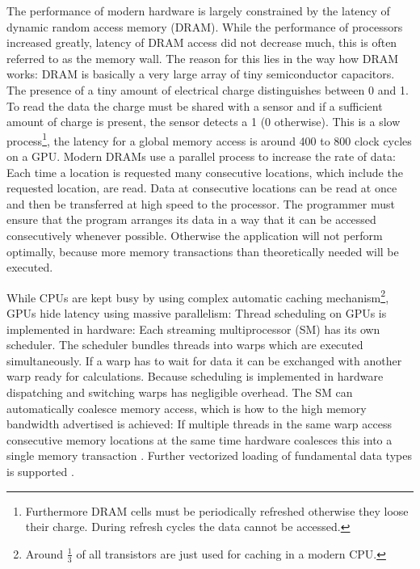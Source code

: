 The performance of modern hardware is largely constrained by the latency of dynamic random access memory (DRAM). While the performance of processors increased greatly, latency of DRAM access did not decrease much, this is often referred to as the memory wall. The reason for this lies in the way how DRAM works: DRAM is basically a very large array of tiny semiconductor capacitors. The presence of a tiny amount of electrical charge distinguishes between 0 and 1. To read the data the charge must be shared with a sensor and if a sufficient amount of charge is present, the sensor detects a 1 (0 otherwise). This is a slow process\footnote{Furthermore DRAM cells must be periodically refreshed otherwise they loose their charge. During refresh cycles the data cannot be accessed.}, the latency for a global memory access is around 400 to 800 clock cycles \cite[5.2.3]{cudaguide} on a GPU.  Modern DRAMs use a parallel process to increase the rate of data: Each time a location is requested many consecutive locations, which include the requested location, are read. Data at consecutive locations can be read at once and then be transferred at high speed to the processor. The programmer must ensure that the program arranges its data in a way that it can be accessed consecutively whenever possible. Otherwise the application will not perform optimally, because more memory transactions than theoretically needed will be executed.

While CPUs are kept busy by using complex automatic caching mechanism\footnote{Around $\frac{1}{3}$ of all transistors are just used for caching in a modern CPU.}, GPUs hide latency using massive parallelism: Thread scheduling on GPUs is implemented in hardware: Each streaming multiprocessor (SM) has its own scheduler. The scheduler bundles threads into warps which are executed simultaneously. If a warp has to wait for data it can be exchanged with another warp ready for calculations. Because scheduling is implemented in hardware dispatching and switching warps has negligible overhead. The SM can automatically coalesce memory access, which is how to the high memory bandwidth advertised \cite[Figure 1.1]{cudaguide} is achieved: If multiple threads in the same warp access consecutive memory locations at the same time hardware coalesces this into a single memory transaction \cite[Appendix F 3.2.1]{cudaguide}. Further vectorized loading of fundamental data types is supported \cite[Table 86]{ptxMan}.


